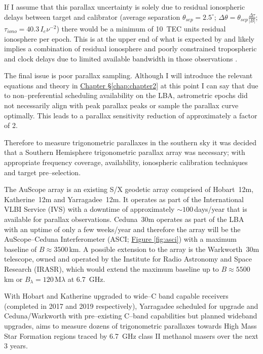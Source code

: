         If I assume that this parallax uncertainty is solely due to residual ionospheric delays between target and calibrator (average separation $\theta_{sep}=2.5^\circ$; $\Delta\theta=\theta_{sep}\frac{\Delta\tau}{|B|}$; $\tau_{iono}=40.3\,I_e\nu^{-2}$) there would be a minimum of 10~TEC units residual ionosphere per epoch. This is at the upper end of what is expected by \citet{WalkerChatterjee1999} and likely implies a combination of residual ionosphere and poorly constrained tropospheric and clock delays due to limited available bandwidth in those observations \citep[see ][ for more details]{Krishnan2015}.
        
        The final issue is poor parallax sampling. Although I will introduce the relevant equations and theory in \hyperref[chap:chapter2]{Chapter \S\ref*{chap:chapter2}} at this point I can say that due to non--preferential scheduling availability on the LBA, astrometric epochs did not necessarily align with peak parallax peaks or sample the parallax curve optimally. This leads to a parallax sensitivity reduction of approximately a factor of 2.
        
        Therefore to measure trigonometric parallaxes in the southern sky it was decided that a Southern Hemisphere trigonometric parallax array was necessary; with appropriate frequency coverage, availability, ionospheric calibration techniques and target pre--selection. 
        
        The AuScope array \citep{Lovell2013} is an existing S/X geodetic array comprised of Hobart~12m,  Katherine~12m and Yarragadee~12m. It operates as part of the International VLBI Service (IVS) with a downtime of approximately $\sim100$\,days/year that is available for parallax observations. Ceduna~30m \citep{McCulloch2005} operates as part of the LBA with an uptime of only a few weeks/year and therefore the array will be the AuScope--Ceduna Interferometer (ASCI; \hyperref[fig:asci]{Figure \ref*{fig:asci}}) with a maximum baseline of $B\approx3500$\,km. A possible extension to the array is the Warkworth~30m telescope, owned and operated by the Institute for Radio Astronomy and Space Research (IRASR), which would extend the maximum baseline up to $B\approx5500$\,km or $B_\lambda=120$\,M$\lambda$ at 6.7~GHz.
        
        With Hobart and Katherine upgraded to wide--C band capable receivers (completed in 2017 and 2019 respectively), Yarragadee scheduled for upgrade and Ceduna/Warkworth with pre--existing C--band capabilities but planned wideband upgrades, \spirals\space aims to measure dozens of trigonometric parallaxes towards High Mass Star Formation regions traced by 6.7~GHz class II methanol masers over the next 3 years.
        
